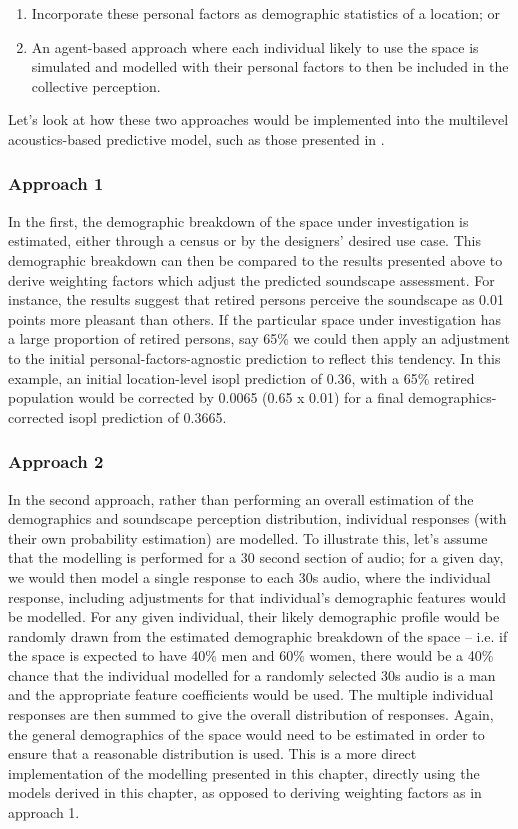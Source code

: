 \begin{enumerate}
  \item Incorporate these personal factors as demographic statistics of a location; or
  \item An agent-based approach where each individual likely to use the space is simulated and modelled with their personal factors to then be included in the collective perception.
\end{enumerate}

Let's look at how these two approaches would be implemented into the multilevel acoustics-based predictive model, such as those presented in .

\subsubsection{Approach 1}
In the first, the demographic breakdown of the space under investigation is estimated, either through a census or by the designers' desired use case. This demographic breakdown can then be compared to the results presented above \citep{Erfanian2021Psychological} to derive weighting factors which adjust the predicted soundscape assessment. For instance, the results suggest that retired persons perceive the soundscape as 0.01 points more pleasant than others. If the particular space under investigation has a large proportion of retired persons, say 65\% we could then apply an adjustment to the initial personal-factors-agnostic prediction to reflect this tendency. In this example, an initial location-level \gls{isopl} prediction of 0.36, with a 65\% retired population would be corrected by 0.0065 (0.65 x 0.01) for a final demographics-corrected \gls{isopl} prediction of 0.3665.

\subsubsection{Approach 2}
In the second approach, rather than performing an overall estimation of the demographics and soundscape perception distribution, individual responses (with their own probability estimation) are modelled. To illustrate this, let's assume that the modelling is performed for a 30 second section of audio; for a given day, we would then model a single response to each 30s audio, where the individual response, including adjustments for that individual's demographic features would be modelled. For any given individual, their likely demographic profile would be randomly drawn from the estimated demographic breakdown of the space -- i.e. if the space is expected to have 40\% men and 60\% women, there would be a 40\% chance that the individual modelled for a randomly selected 30s audio is a man and the appropriate feature coefficients would be used. The multiple individual responses are then summed to give the overall distribution of responses. Again, the general demographics of the space would need to be estimated in order to ensure that a reasonable distribution is used. This is a more direct implementation of the modelling presented in this chapter, directly using the models derived in this chapter, as opposed to deriving weighting factors as in approach 1.

